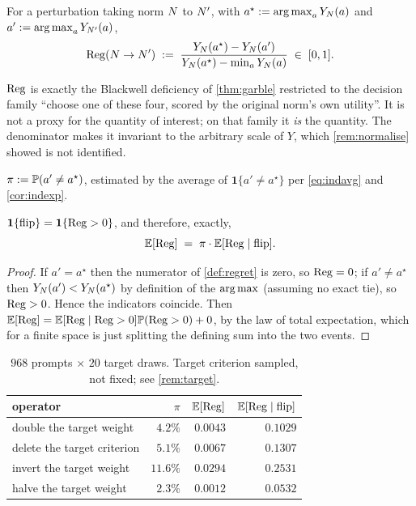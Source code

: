 \begin{definition}
\label{def:regret}
For a perturbation taking norm $N$ to $N'$, with $a^\star := \operatorname*{arg\,max}_a Y_{N}(a)$
and $a' := \operatorname*{arg\,max}_a Y_{N'}(a)$,
\[
\mathrm{Reg}(N\to N') \;:=\;
\frac{Y_{N}(a^\star) - Y_{N}(a')}{Y_{N}(a^\star) - \min_a Y_{N}(a)}
\;\in\;[0,1].
\]
\end{definition}

 $\mathrm{Reg}$ is exactly the Blackwell
deficiency of \cref{thm:garble} restricted to the decision family ``choose one of
these four, scored by the original norm's own utility''. It is not a proxy for
the quantity of interest; on that family it \emph{is} the quantity. The
denominator makes it invariant to the arbitrary scale of $Y$, which
\cref{rem:normalise} showed is not identified.

\begin{definition}
$\pi := \mathbb{P}(a' \neq a^\star)$, estimated by the average of
$\mathbf{1}\{a'\neq a^\star\}$ per \cref{eq:indavg} and \cref{cor:indexp}.
\end{definition}

\begin{lemma}
\label{lem:coarsen}
$\mathbf{1}\{\text{flip}\} = \mathbf{1}\{\mathrm{Reg}>0\}$, and therefore, exactly,
\[
\mathbb{E}[\mathrm{Reg}] \;=\; \pi \cdot \mathbb{E}[\mathrm{Reg} \mid \text{flip}].
\]
\end{lemma}
\begin{proof}
If $a'=a^\star$ then the numerator of \cref{def:regret} is zero, so $\mathrm{Reg}=0$; if
$a'\neq a^\star$ then $Y_N(a')<Y_N(a^\star)$ by definition of the $\operatorname*{arg\,max}$
(assuming no exact tie), so $\mathrm{Reg}>0$. Hence the indicators coincide. Then
$\mathbb{E}[\mathrm{Reg}] = \mathbb{E}[\mathrm{Reg} \mid \mathrm{Reg}>0]\mathbb{P}(\mathrm{Reg}>0) + 0$, by the law of total
expectation, which for a finite space is just splitting the defining sum into the
two events.
\end{proof}

\begin{table}[H]\centering\small
\begin{tabular}{lrrr}
\toprule
operator & $\pi$ & $\mathbb{E}[\mathrm{Reg}]$ & $\mathbb{E}[\mathrm{Reg}\mid\text{flip}]$\\
\midrule
double the target weight & $4.2\%$ & $0.0043$ & $0.1029$\\
delete the target criterion & $5.1\%$ & $0.0067$ & $0.1307$\\
invert the target weight & $11.6\%$ & $0.0294$ & $\mathbf{0.2531}$\\
halve the target weight & $2.3\%$ & $0.0012$ & $0.0532$\\
\bottomrule
\end{tabular}
\caption{$968$ prompts $\times$ $20$ target draws. Target criterion sampled, not
fixed; see \cref{rem:target}.}
\label{tab:regret}
\end{table}


